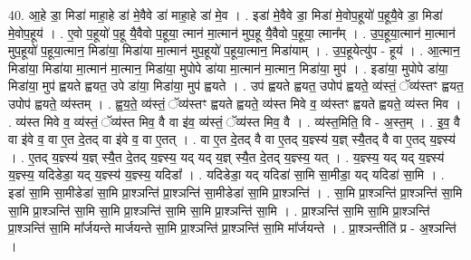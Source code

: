 \documentclass[17pt]{extarticle}
\begin{document}
40. आ॒हे डा॒ मिडा॑ माहा॒हे डा॑ मे॒वैवे डा॑ माहा॒हे डा॑ मे॒व । . इडा॑ मे॒वैवे डा॒ मिडा॑ मे॒वोप॒हूयो॑ प॒हूयै॒वे डा॒ मिडा॑ मे॒वोप॒हूय॑ । . ए॒वो प॒हूयो॑ प॒हू यै॒वैवो प॒हूया॒ त्मान॑ मा॒त्मान॑ मुप॒हू यै॒वैवो प॒हूया॒ त्मान᳚म् । . उ॒प॒हूया॒त्मान॑ मा॒त्मान॑ मुप॒हूयो॑ प॒हूया॒त्मान॒ मिडा॑या॒ मिडा॑या मा॒त्मान॑ मुप॒हूयो॑ प॒हूया॒त्मान॒ मिडा॑याम् । . उ॒प॒हूयेत्यु॑प - हूय॑ । . आ॒त्मान॒ मिडा॑या॒ मिडा॑या मा॒त्मान॑ मा॒त्मान॒ मिडा॑या॒ मुपोपे डा॑या मा॒त्मान॑ मा॒त्मान॒ मिडा॑या॒ मुप॑ । . इडा॑या॒ मुपोपे डा॑या॒ मिडा॑या॒ मुप॑ ह्वयते ह्वयत॒ उपे डा॑या॒ मिडा॑या॒ मुप॑ ह्वयते । . उप॑ ह्वयते ह्वयत॒ उपोप॑ ह्वयते॒ व्य॑स्तं॒ ॅव्य॑स्तꣳ ह्वयत॒ उपोप॑ ह्वयते॒ व्य॑स्तम् । . ह्व॒य॒ते॒ व्य॑स्तं॒ ॅव्य॑स्तꣳ ह्वयते ह्वयते॒ व्य॑स्त मिवे व॒ व्य॑स्तꣳ ह्वयते ह्वयते॒ व्य॑स्त मिव । . व्य॑स्त मिवे व॒ व्य॑स्तं॒ ॅव्य॑स्त मिव॒ वै वा इ॑व॒ व्य॑स्तं॒ ॅव्य॑स्त मिव॒ वै । . व्य॑स्त॒मिति॒ वि - अ॒स्त॒म् । . इ॒व॒ वै वा इ॑वे व॒ वा ए॒त दे॒तद् वा इ॑वे व॒ वा ए॒तत् । . वा ए॒त दे॒तद् वै वा ए॒तद् य॒ज्ञ्स्य॑ य॒ज्ञ् स्यै॒तद् वै वा ए॒तद् य॒ज्ञ्स्य॑ । . ए॒तद् य॒ज्ञ्स्य॑ य॒ज्ञ् स्यै॒त दे॒तद् य॒ज्ञ्स्य॒ यद् यद् य॒ज्ञ् स्यै॒त दे॒तद् य॒ज्ञ्स्य॒ यत् । . य॒ज्ञ्स्य॒ यद् यद् य॒ज्ञ्स्य॑ य॒ज्ञ्स्य॒ यदिडेडा॒ यद् य॒ज्ञ्स्य॑ य॒ज्ञ्स्य॒ यदिडा᳚ । . यदिडेडा॒ यद् यदिडा॑ सा॒मि सा॒मीडा॒ यद् यदिडा॑ सा॒मि । . इडा॑ सा॒मि सा॒मीडेडा॑ सा॒मि प्रा॒श्ञन्ति॑ प्रा॒श्ञन्ति॑ सा॒मीडेडा॑ सा॒मि प्रा॒श्ञन्ति॑ । . सा॒मि प्रा॒श्ञन्ति॑ प्रा॒श्ञन्ति॑ सा॒मि सा॒मि प्रा॒श्ञन्ति॑ सा॒मि सा॒मि प्रा॒श्ञन्ति॑ सा॒मि सा॒मि प्रा॒श्ञन्ति॑ सा॒मि । . प्रा॒श्ञन्ति॑ सा॒मि सा॒मि प्रा॒श्ञन्ति॑ प्रा॒श्ञन्ति॑ सा॒मि मा᳚र्जयन्ते मार्जयन्ते सा॒मि प्रा॒श्ञन्ति॑ प्रा॒श्ञन्ति॑ सा॒मि मा᳚र्जयन्ते । . प्रा॒श्ञन्तीति॑ प्र - अ॒श्ञन्ति॑ । \newline
\pagebreak
{}
\end{document}
